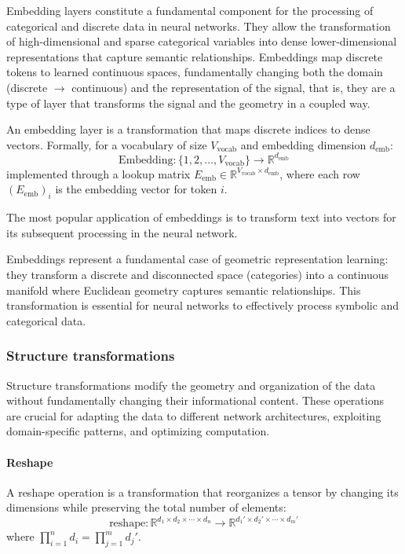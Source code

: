 Embedding layers constitute a fundamental component for the processing of categorical and discrete data in neural networks. They allow the transformation of high-dimensional and sparse categorical variables into dense lower-dimensional representations that capture semantic relationships. Embeddings map discrete tokens to learned continuous spaces, fundamentally changing both the domain (discrete $\to$ continuous) and the representation of the signal, that is, they are a type of layer that transforms the signal and the geometry in a coupled way.

\begin{definition}\label{def:capa_embedding}
	An embedding layer is a transformation that maps discrete indices to dense vectors. Formally, for a vocabulary of size $V_{\text{vocab}}$ and embedding dimension $d_{\text{emb}}$:
	\[
	\text{Embedding}: \{1, 2, \ldots, V_{\text{vocab}}\} \to \mathbb{R}^{d_{\text{emb}}}
	\]
	implemented through a lookup matrix $E_{\text{emb}} \in \mathbb{R}^{V_{\text{vocab}} \times d_{\text{emb}}}$, where each row $(E_{\text{emb}})_i$ is the embedding vector for token $i$.
\end{definition}

The most popular application of embeddings is to transform text into vectors for its subsequent processing in the neural network.

Embeddings represent a fundamental case of geometric representation learning: they transform a discrete and disconnected space (categories) into a continuous manifold where Euclidean geometry captures semantic relationships. This transformation is essential for neural networks to effectively process symbolic and categorical data.

\subsubsection{Structure transformations}

Structure transformations modify the geometry and organization of the data without fundamentally changing their informational content. These operations are crucial for adapting the data to different network architectures, exploiting domain-specific patterns, and optimizing computation.

\paragraph{Reshape}

\begin{definition}\label{def:reshape}
	A reshape operation is a transformation that reorganizes a tensor by changing its dimensions while preserving the total number of elements:
	\[
	\text{reshape}: \mathbb{R}^{d_1 \times d_2 \times \cdots \times d_n} \to \mathbb{R}^{d_1' \times d_2' \times \cdots \times d_m'}
	\]
	where $\prod_{i=1}^n d_i = \prod_{j=1}^m d_j'$.
\end{definition}

